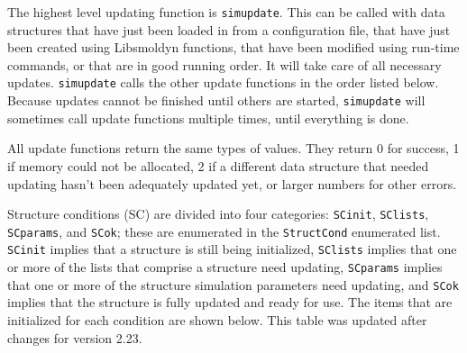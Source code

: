 \documentclass {book}
\begin{document}
The highest level updating function is \texttt{simupdate}. This can be called with data structures that have just been loaded in from a configuration file, that have just been created using Libsmoldyn functions, that have been modified using run-time commands, or that are in good running order. It will take care of all necessary updates. \texttt{simupdate} calls the other update functions in the order listed below. Because updates cannot be finished until others are started, \texttt{simupdate} will sometimes call update functions multiple times, until everything is done.

All update functions return the same types of values. They return 0 for success, 1 if memory could not be allocated, 2 if a different data structure that needed updating hasn't been adequately updated yet, or larger numbers for other errors.

Structure conditions (SC) are divided into four categories: \texttt{SCinit}, \texttt{SClists}, \texttt{SCparams}, and \texttt{SCok}; these are enumerated in the \texttt{StructCond} enumerated list. \texttt{SCinit} implies that a structure is still being initialized, \texttt{SClists} implies that one or more of the lists that comprise a structure need updating, \texttt{SCparams} implies that one or more of the structure simulation parameters need updating, and \texttt{SCok} implies that the structure is fully updated and ready for use. The items that are initialized for each condition are shown below. This table was updated after changes for version 2.23.
\end{document}
